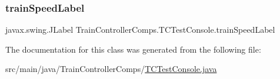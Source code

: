 \mbox{\label{classTrainControllerComps_1_1TCTestConsole_a6d89bc3a12936a14165ba016d51df6b6}} 
\subsubsection{\texorpdfstring{train\+Speed\+Label}{trainSpeedLabel}}
{\footnotesize\ttfamily javax.\+swing.\+J\+Label Train\+Controller\+Comps.\+T\+C\+Test\+Console.\+train\+Speed\+Label\hspace{0.3cm}{\ttfamily [private]}}



The documentation for this class was generated from the following file\+:\begin{DoxyCompactItemize}
\item 
src/main/java/\+Train\+Controller\+Comps/\hyperlink{TCTestConsole_8java}{T\+C\+Test\+Console.\+java}\end{DoxyCompactItemize}
